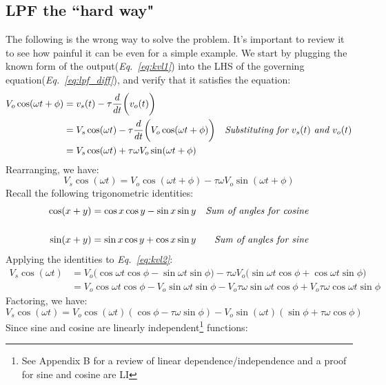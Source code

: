 \subsection{LPF the ``hard way"}
The following is the wrong way to solve the problem.  It's important to review it to see how painful it can be even for a simple example.  We start by plugging the known form of the output(\emph{Eq.~\ref{eq:kvl1}}) into the LHS of the governing equation(\emph{Eq.~\ref{eq:lpf_diff}}), and verify that it satisfies the equation:
    \begin{align*}
        V_o \cos(\omega t + \phi) &= v_s(t) - \tau \frac{d}{dt}\bigg( v_o(t) \bigg)\\
        &= V_s \cos(\omega t) - \tau \frac{d}{dt}\bigg( V_o \cos(\omega t + \phi) \bigg)
            &\text{\emph{Substituting for $v_s(t)$ and $v_o(t)$}}\\
        &= V_s \cos(\omega t) + \tau \omega V_o \sin(\omega t + \phi)
    \end{align*}
Rearranging, we have:
    \begin{equation}
        V_s \cos(\omega t) = V_o \cos(\omega t + \phi) - \tau \omega V_o \sin(\omega t + \phi) \label{eq:kvl2}
    \end{equation}
Recall the following trigonometric identities:
    \begin{align*}
        \cos(x + y) &= \cos x \cos y - \sin x \sin y &\text{\emph{Sum of angles for cosine}}\\ \\
        \sin(x + y) &= \sin x \cos y + \cos x \sin y &\text{\emph{Sum of angles for sine}}
    \end{align*}
Applying the identities to \emph{Eq.~\ref{eq:kvl2}}:
    \begin{align*}
        V_s \cos(\omega t) &= V_o \big(\cos \omega t \cos \phi - \sin \omega t \sin \phi \big)
            - \tau \omega V_o \big( \sin \omega t \cos \phi + \cos \omega t \sin \phi \big)\\
        &= V_o \cos \omega t \cos \phi - V_o \sin \omega t \sin \phi
            - V_o \tau \omega \sin \omega t \cos \phi + V_o \tau \omega \cos \omega t \sin \phi
    \end{align*}
Factoring, we have:
    \begin{equation}
        V_s \cos(\omega t) = V_o \cos(\omega t) (\cos \phi - \tau \omega \sin\phi) - V_o \sin(\omega t) (\sin\phi + \tau \omega \cos\phi)
    \end{equation}
Since sine and cosine are linearly independent\footnote{See Appendix B for a review of linear dependence/independence and a proof for sine and cosine are LI} functions:

